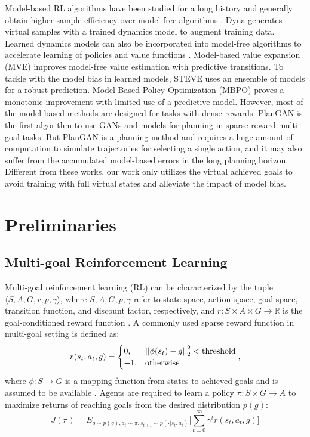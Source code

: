 \documentclass{article}
\begin{document}
Model-based RL algorithms have been studied for a long history and generally obtain higher sample efficiency over model-free algorithms \cite{atkeson1997comparison}. Dyna \cite{sutton1991dyna} generates virtual samples with a trained dynamics model to augment training data. Learned dynamics models can also be incorporated into model-free algorithms to accelerate learning of policies and value functions \cite{nagabandi2018neural}. Model-based value expansion (MVE) \cite{feinberg2018model} improves model-free value estimation with predictive transitions. To tackle with the model bias in learned models, STEVE \cite{buckman2018sample} uses an ensemble of models for a robust prediction. Model-Based Policy Optimization (MBPO) \cite{DBLP:conf/nips/JannerFZL19} proves a monotonic improvement with limited use of a predictive model. However, most of the model-based methods are designed for tasks with dense rewards. PlanGAN \cite{DBLP:conf/nips/CharlesworthM20} is the first algorithm to use GANs and models for planning in sparse-reward multi-goal tasks. But PlanGAN is a planning method and requires a huge amount of computation to simulate trajectories for selecting a single action, and it may also suffer from the accumulated model-based errors in the long planning horizon. Different from these works, our work only utilizes the virtual achieved goals to avoid training with full virtual states and alleviate the impact of model bias. 



\section{Preliminaries}
\label{sec:preliminary}
\subsection{Multi-goal Reinforcement Learning}
Multi-goal reinforcement learning (RL) can be characterized by the tuple $\langle S, A, G, r, p, \gamma\rangle$, where $S, A, G, p, \gamma$ refer to state space, action space, goal space, transition function, and discount factor, respectively, and $r: S \times A \times G \rightarrow \mathbb{R}$ is the goal-conditioned reward function \cite{schaul2015universal}. A commonly used sparse reward function in multi-goal setting is defined as:
\begin{equation}
\label{equ:rewardfunction}
    r(s_t, a_t,g)=\begin{cases}0, & \left|\left|\phi(s_{t})-g\right|\right|^2_2 < \text{threshold} \cr -1, &\text{otherwise}\end{cases} ,
\end{equation}
where $\phi: S \rightarrow G$ is a mapping function from states to achieved goals and is assumed to be available \cite{andrychowicz2017hindsight}. Agents are required to learn a policy $\pi:S\times G \rightarrow A$ to maximize returns of reaching goals from the desired distribution $p(g)$:
\begin{equation}
\label{eq:objective}
    J(\pi)=E_{g\sim p(g),a_t \sim \pi, s_{t+1}\sim p(\cdot|s_t,a_t)}\big[\sum^{\infty}_{t=0} \gamma^t r(s_t, a_t, g) \big]
\end{equation}
\end{document}
